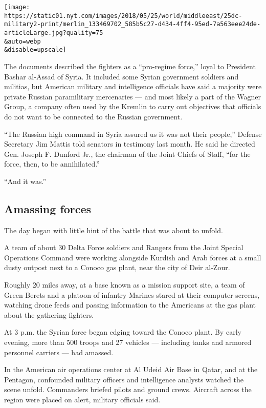 \texttt{[image: https://static01.nyt.com/images/2018/05/25/world/middleeast/25dc-military2-print/merlin\_133469702\_585b5c27-d434-4ff4-95ed-7a563eee24de-articleLarge.jpg?quality=75\\\&auto=webp\\\&disable=upscale]}

The documents described the fighters as a ``pro-regime force,'' loyal to
President Bashar al-Assad of Syria. It included some Syrian government
soldiers and militias, but American military and intelligence officials
have said a majority were private Russian paramilitary mercenaries ---
and most likely a part of the Wagner Group, a company often used by the
Kremlin to carry out objectives that officials do not want to be
connected to the Russian government.

``The Russian high command in Syria assured us it was not their
people,'' Defense Secretary Jim Mattis told senators in testimony last
month. He said he directed Gen. Joseph F. Dunford Jr., the chairman of
the Joint Chiefs of Staff, ``for the force, then, to be annihilated.''

``And it was.''

\hypertarget{amassing-forces}{%
\subsection{Amassing forces}\label{amassing-forces}}

The day began with little hint of the battle that was about to unfold.

A team of about 30 Delta Force soldiers and Rangers from the Joint
Special Operations Command were working alongside Kurdish and Arab
forces at a small dusty outpost next to a Conoco gas plant, near the
city of Deir al-Zour.

Roughly 20 miles away, at a base known as a mission support site, a team
of Green Berets and a platoon of infantry Marines stared at their
computer screens, watching drone feeds and passing information to the
Americans at the gas plant about the gathering fighters.

At 3 p.m. the Syrian force began edging toward the Conoco plant. By
early evening, more than 500 troops and 27 vehicles --- including tanks
and armored personnel carriers --- had amassed.

In the American air operations center at Al Udeid Air Base in Qatar, and
at the Pentagon, confounded military officers and intelligence analysts
watched the scene unfold. Commanders briefed pilots and ground crews.
Aircraft across the region were placed on alert, military officials
said.

